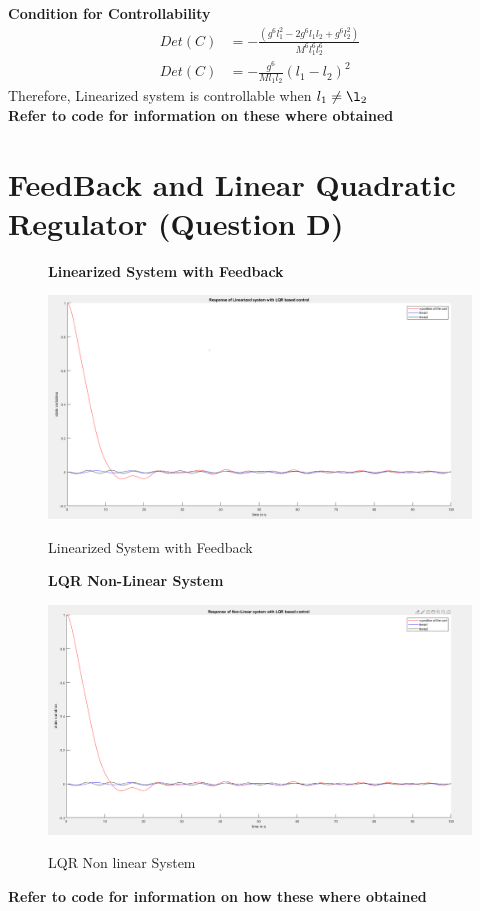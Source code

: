 \documentclass[12pt]{article}
\begin{document}
\textbf{Condition for Controllability}
\begin{align}
  Det(C) &= -\frac{(g^6l_1^2-2g^6l_1l_2+g^6l_2^2)}{M^6l_1^6l_2^6} \\
  Det(C) &= -\frac{g^6}{Ml_1l_2}(l_1-l_2)^2
\end{align}
Therefore, Linearized system is controllable when $l_1 \neq \l_2$ \\
\textbf{Refer to code for information on these where obtained}

\section{FeedBack and Linear Quadratic Regulator (Question D)}
\begin{figure}[H]
    \centering
    \textbf{ Linearized System with Feedback }\par\medskip
    \includegraphics[scale = 0.3]{lqrlinearized.png}\\[0.0 cm]	%
    \caption{Linearized System with Feedback} 
\end{figure}

\begin{figure}[H]
    \centering
    \textbf{ LQR Non-Linear System}\par\medskip
    \includegraphics[scale = 0.3]{lqrNonlinearized.png}\\[0.0 cm]	%
    \caption{LQR Non linear System} 
\end{figure}
\textbf{Refer to code for information on how these where obtained}
\end{document}
